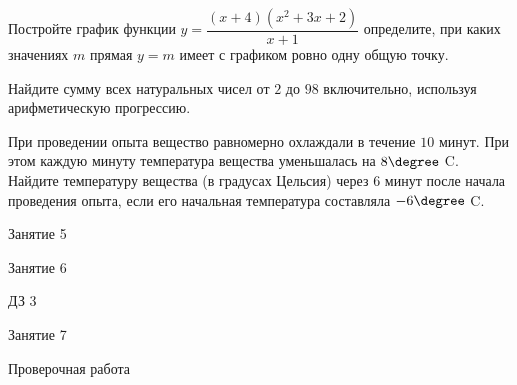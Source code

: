 \begin{homework}[number=2]
	\begin{listofex}
		\item Постройте график функции \( y=\dfrac{(x+4)(x^2+3x+2)}{x+1} \) определите, при каких значениях \( m \) прямая \( y=m \) имеет с графиком ровно одну общую точку.
		\item Найдите сумму всех натуральных чисел от \( 2 \) до \( 98 \) включительно, используя арифметическую прогрессию.
		\item При проведении опыта вещество равномерно охлаждали в течение \( 10 \) минут. При этом каждую минуту температура вещества уменьшалась на \( 8\degree \) C. Найдите температуру вещества (в градусах Цельсия) через \( 6 \) минут после начала проведения опыта, если его начальная температура составляла \( -6\degree \) C.
	\end{listofex}
\end{homework}

\begin{class}[number=5]
	\begin{listofex}
		\item Занятие 5
	\end{listofex}
\end{class}

\begin{class}[number=6]
	\begin{listofex}
		\item Занятие 6
	\end{listofex}
\end{class}

\begin{homework}[number=3]
	\begin{listofex}
		\item ДЗ 3
	\end{listofex}
\end{homework}

\begin{class}[number=7]
	\begin{listofex}
		\item Занятие 7
	\end{listofex}
\end{class}

\begin{exam}
	\begin{listofex}
		\item Проверочная работа
	\end{listofex}
\end{exam}
